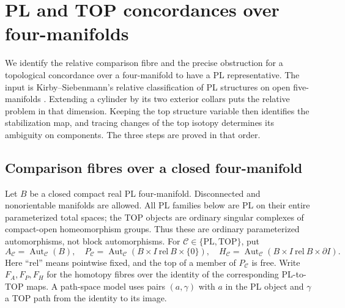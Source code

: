 \section{PL and TOP concordances over four-manifolds}
We identify the relative comparison fibre and the precise obstruction
for a topological concordance over a four-manifold to have a PL
representative. The input is Kirby--Siebenmann's relative classification
of PL structures on open five-manifolds
\cite[Essay~V, (3.2), pp.~240--241, and \S5.6, pp.~252--253]{KirbySiebenmann1977}.
Extending a cylinder by its two exterior collars puts the relative
problem in that dimension. Keeping the top structure variable then
identifies the stabilization map, and tracing changes of the top
isotopy determines its ambiguity on components. The three steps are
proved in that order.

\subsection{Comparison fibres over a closed four-manifold}

Let $B$ be a closed compact real PL four-manifold.  Disconnected and
nonorientable manifolds are allowed.  All PL families below are PL on
their entire parameterized total spaces; the TOP objects are ordinary
singular complexes of compact-open homeomorphism groups.  Thus these
are ordinary parameterized automorphisms, not block automorphisms.
For $\mathcal C\in\{\mathrm{PL},\mathrm{TOP}\}$, put
\[
 A_{\mathcal C}=\operatorname{Aut}_{\mathcal C}(B),\quad
 P_{\mathcal C}=\operatorname{Aut}_{\mathcal C}
       (B\times I\ \mathrm{rel}\ B\times\{0\}),\quad
 H_{\mathcal C}=\operatorname{Aut}_{\mathcal C}
       (B\times I\ \mathrm{rel}\ B\times\partial I).
\]
Here ``rel'' means pointwise fixed, and the top of a member of
$P_{\mathcal C}$ is free.  Write $F_A,F_P,F_H$ for the homotopy fibres
over the identity of the corresponding PL-to-TOP maps.  A path-space
model uses pairs $(a,\gamma)$ with $a$ in the PL object and $\gamma$
a TOP path from the identity to its image.

